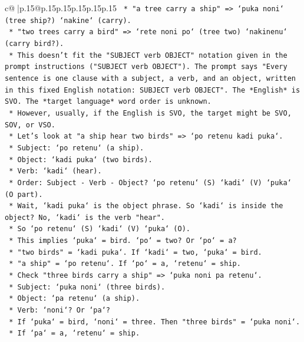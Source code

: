 \documentclass{article}
\begin{document}
{\begin{supertabular}{c@{$\;$}|p{.15\linewidth}@{}p{.15\linewidth}p{.15\linewidth}p{.15\linewidth}p{.15\linewidth}p{.15\linewidth}}
{{{\texttt{        *   "a tree carry a ship" => `puka noni` (tree ship?) `nakine` (carry).} \\
\texttt{        *   "two trees carry a bird" => `rete noni po` (tree two) `nakinenu` (carry bird?).} \\
\texttt{        *   This doesn't fit the "SUBJECT verb OBJECT" notation given in the prompt instructions ("SUBJECT verb OBJECT"). The prompt says "Every sentence is one clause with a subject, a verb, and an object, written in this fixed English notation: SUBJECT verb OBJECT". The *English* is SVO. The *target language* word order is unknown.} \\
\texttt{        *   However, usually, if the English is SVO, the target might be SVO, SOV, or VSO.} \\
\texttt{        *   Let's look at "a ship hear two birds" => `po retenu kadi puka`.} \\
\texttt{            *   Subject: `po retenu` (a ship).} \\
\texttt{            *   Object: `kadi puka` (two birds).} \\
\texttt{            *   Verb: `kadi` (hear).} \\
\texttt{            *   Order: Subject {-} Verb {-} Object? `po retenu` (S) `kadi` (V) `puka` (O part).} \\
\texttt{            *   Wait, `kadi puka` is the object phrase. So `kadi` is inside the object? No, `kadi` is the verb "hear".} \\
\texttt{            *   So `po retenu` (S) `kadi` (V) `puka` (O).} \\
\texttt{            *   This implies `puka` = bird. `po` = two? Or `po` = a?} \\
\texttt{            *   "two birds" = `kadi puka`. If `kadi` = two, `puka` = bird.} \\
\texttt{            *   "a ship" = `po retenu`. If `po` = a, `retenu` = ship.} \\
\texttt{            *   Check "three birds carry a ship" => `puka noni pa retenu`.} \\
\texttt{                *   Subject: `puka noni` (three birds).} \\
\texttt{                *   Object: `pa retenu` (a ship).} \\
\texttt{                *   Verb: `noni`? Or `pa`?} \\
\texttt{                *   If `puka` = bird, `noni` = three. Then "three birds" = `puka noni`.} \\
\texttt{                *   If `pa` = a, `retenu` = ship.} \\
}}}
\end{supertabular}}
\end{document}
